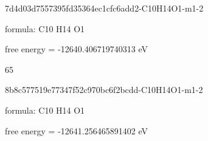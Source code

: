 \documentclass{article}
\begin{document}
\vspace{1cm}


7d4d03d7557395fd35364ec1cfc6add2-C10H14O1-m1-2



formula: C10 H14 O1



free energy = -12640.406719740313 eV

65

\vspace{1cm}


8b8c577519e77347f52c970bc6f2bcdd-C10H14O1-m1-2



formula: C10 H14 O1



free energy = -12641.256465891402 eV
\end{document}
